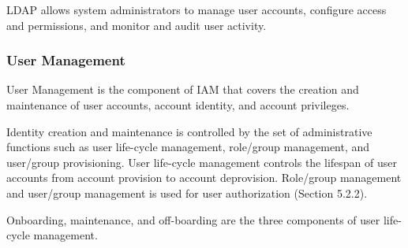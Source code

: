 LDAP allows system administrators to manage user accounts, configure access and permissions, and monitor and audit user activity.

\subsubsection{User Management}

User Management is the component of IAM that covers the creation and maintenance of user accounts, account identity, and account privileges. 

Identity creation and maintenance is controlled by the set of administrative functions such as user life-cycle management, role/group management, and user/group provisioning. User life-cycle management controls the lifespan of user accounts from account provision to account deprovision. Role/group management and user/group management is used for user authorization (Section 5.2.2). 

Onboarding, maintenance, and off-boarding are the three components of user life-cycle management. 

